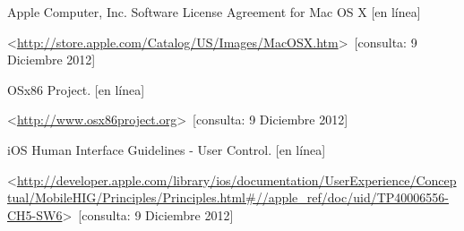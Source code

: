 \begin{thebibliography}{99}
\begin{sloppypar}
%
Apple Computer, Inc. Software License Agreement for Mac OS X [en línea]\

\textless \url{http://store.apple.com/Catalog/US/Images/MacOSX.htm}\textgreater \ [consulta: 9 Diciembre 2012]

%
OSx86 Project. [en línea]\

\textless \url{http://www.osx86project.org}\textgreater \ [consulta: 9 Diciembre 2012]

%
iOS Human Interface Guidelines - User Control. [en línea]\

\textless \url{http://developer.apple.com/library/ios/documentation/UserExperience/Conceptual/MobileHIG/Principles/Principles.html\#//apple_ref/doc/uid/TP40006556-CH5-SW6}\textgreater \ [consulta: 9 Diciembre 2012]


\end{sloppypar}
\end{thebibliography}

